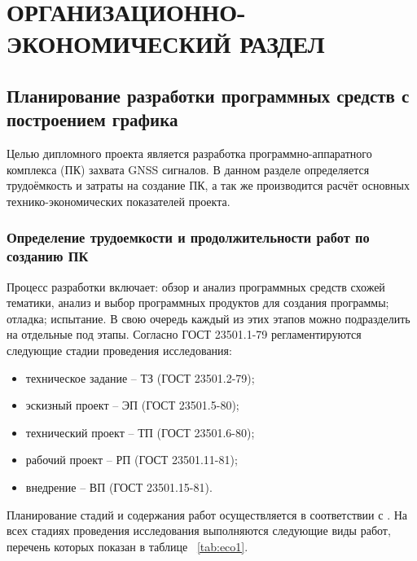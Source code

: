 \setcounter{section}{4}

\section{ОРГАНИЗАЦИОННО-ЭКОНОМИЧЕСКИЙ РАЗДЕЛ}
\subsection{Планирование разработки программных средств с построением графика}
Целью дипломного проекта является разработка программно-аппаратного комплекса (ПК) захвата GNSS сигналов.
В данном разделе определяется трудоёмкость и затраты на создание ПК, а так же производится расчёт основных технико-экономических
показателей проекта.

\subsubsection*{Определение трудоемкости и продолжительности работ по созданию ПК}
Процесс разработки включает: обзор и анализ программных средств схожей тематики, анализ и выбор программных продуктов для
создания программы; отладка; испытание. В свою очередь каждый из этих этапов можно подразделить на отдельные под этапы.
Согласно ГОСТ 23501.1-79 регламентируются следующие стадии проведения исследования:

\begin{itemize}
	\item техническое задание – ТЗ (ГОСТ 23501.2-79);
	\item эскизный проект – ЭП (ГОСТ 23501.5-80);
	\item технический проект – ТП (ГОСТ 23501.6-80);
	\item рабочий проект – РП (ГОСТ 23501.11-81);
	\item внедрение – ВП (ГОСТ 23501.15-81).
\end{itemize}

Планирование стадий и содержания работ осуществляется в соответствии с \cite{bibl51}. На всех стадиях проведения исследования
выполняются следующие виды работ, перечень которых показан в таблице ~\ref{tab:eco1}.


